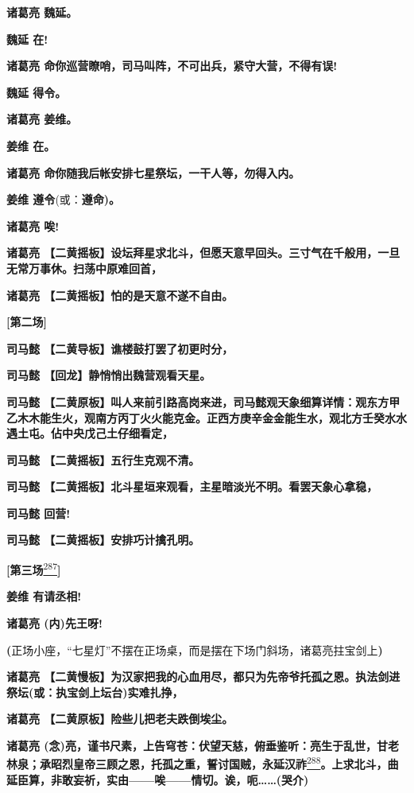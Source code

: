\textbf{诸葛亮 魏延。}

\textbf{魏延 在!}

\textbf{诸葛亮 命你巡营瞭哨，司马叫阵，不可出兵，紧守大营，不得有误!}

\textbf{魏延 得令。}

\textbf{诸葛亮 姜维。}

\textbf{姜维 在。}

\textbf{诸葛亮 命你随我后帐安排七星祭坛，一干人等，勿得入内。}

\textbf{姜维 遵令}(或：\textbf{遵命)。}

\textbf{诸葛亮 唉!}

\textbf{诸葛亮
【二黄摇板】设坛拜星求北斗，但愿天意早回头。三寸气在千般用，一旦无常万事休。扫荡中原难回首，}

\textbf{诸葛亮 【二黄摇板】怕的是天意不遂不自由。}

\textbf{{[}第二场{]}}

\textbf{司马懿 【二黄导板】谯楼鼓打罢了初更时分，}

\textbf{司马懿 【回龙】静悄悄出魏营观看天星。}

\textbf{司马懿
【二黄原板】叫人来前引路高岗来进，司马懿观天象细算详情：观东方甲乙木木能生火，观南方丙丁火火能克金。正西方庚辛金金能生水，观北方壬癸水水遇土屯。佔中央戊己土仔细看定，}

\textbf{司马懿 【二黄摇板】五行生克观不清。}

\textbf{司马懿
【二黄摇板】北斗星垣来观看，主星暗淡光不明。看罢天象心拿稳，}

\textbf{司马懿 回营!}

\textbf{司马懿 【二黄摇板】安排巧计擒孔明。}

\textbf{{[}第三场}\protect\hyperlink{fn287}{\textsuperscript{287}}\textbf{{]}}

\textbf{姜维 有请丞相!}

\textbf{诸葛亮 (内)先王呀!}

\textbf{(}正场小座，``七星灯''不摆在正场桌，而是摆在下场门斜场，诸葛亮拄宝剑上\textbf{)}

\textbf{诸葛亮
【二黄慢板】为汉家把我的心血用尽，都只为先帝爷托孤之恩。执法剑进祭坛(或：执宝剑上坛台)实难扎挣，}

\textbf{诸葛亮 【二黄原板】险些儿把老夫跌倒埃尘。}

\textbf{诸葛亮
(念)亮，谨书尺素，上告穹苍：伏望天慈，俯垂鉴听：亮生于乱世，甘老林泉；承昭烈皇帝三顾之恩，托孤之重，誓讨国贼，永延汉祚}\protect\hyperlink{fn288}{\textsuperscript{288}}\textbf{。上求北斗，曲延臣算，非敢妄祈，实由------唉------情切。诶，呃\ldots{}\ldots{}(哭介)}

